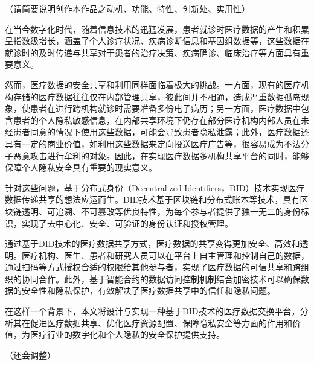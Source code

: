 \documentclass{cumcmthesis}
\numberwithin{equation}{section} %
\numberwithin{figure}{section} %
\numberwithin{table}{section} %
\begin{document}
	
\normalem

\maketitle
 
\newpage
\thispagestyle{empty}
\tableofcontents
\newpage
 
%

\setcounter{page}{1}
 
\begin{cnabstract}
	
（请简要说明创作本作品之动机、功能、特性、创新处、实用性）

在当今数字化时代，随着信息技术的迅猛发展，患者就诊时医疗数据的产生和积累呈指数级增长，涵盖了个人诊疗状况、疾病诊断信息和基因组数据等，这些数据在就诊时的及时传递与共享对于患者的治疗决策、疾病确诊、临床治疗等方面具有重要意义。

然而，医疗数据的安全共享和利用同样面临着极大的挑战。一方面，现有的医疗机构存储的医疗数据往往仅在内部管理共享，彼此间并不相通，造成严重数据孤岛现象，使患者在进行跨机构就诊时需要准备多份电子病历；另一方面，医疗数据中包含患者的个人隐私敏感信息，在内部共享环境下仍存在部分医疗机构内部人员在未经患者同意的情况下使用这些数据，可能会导致患者隐私泄露；此外，医疗数据还具有一定的商业价值，如利用这些数据来定向投送医疗广告等，很容易成为不法分子恶意攻击进行牟利的对象。因此，在实现医疗数据多机构共享平台的同时，能够保障个人隐私安全具有重要的现实意义。

针对这些问题，基于分布式身份（Decentralized Identifiers，DID）技术实现医疗数据传递共享的想法应运而生。DID技术基于区块链和分布式账本等技术，具有区块链透明、可追溯、不可篡改等优良特性，为每个参与者提供了独一无二的身份标识，实现了去中心化、安全、可验证的身份认证和授权管理。

通过基于DID技术的医疗数据共享方式，医疗数据的共享变得更加安全、高效和透明。医疗机构、医生、患者和研究人员可以在平台上自主管理和控制自己的数据，通过扫码等方式授权合适的权限给其他参与者，实现了医疗数据的可信共享和跨组织的协同合作。此外，基于智能合约的数据访问控制机制结合加密技术可以确保数据的安全性和隐私保护，有效解决了医疗数据共享中的信任和隐私问题。

在这样一个背景下，本文将设计与实现一种基于DID技术的医疗数据交换平台，分析其在促进医疗数据共享、优化医疗资源配置、保障隐私安全等方面的作用和价值，为医疗行业的数字化和个人隐私的安全保护提供支持。

（还会调整）
	
\end{cnabstract}
\end{document}
